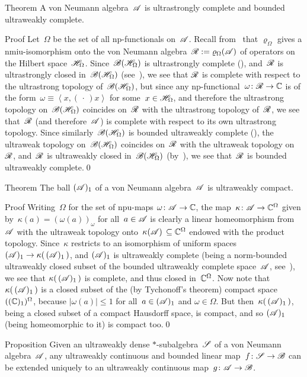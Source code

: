 \documentclass[a]{subfiles}
\begin{document}
\begin{parsec}%
\begin{point}[vn-complete]{Theorem}%
A von Neumann algebra~$\mathscr{A}$ is ultrastrongly complete
and bounded ultraweakly complete.
\begin{point}{Proof}%
Let~$\Omega$ be the set of all np-functionals
on~$\mathscr{A}$.
Recall from~
that $\varrho_\Omega$
gives a nmiu-isomorphism
onto the 
von Neumann algebra~$\mathscr{R}:=\varrho_\Omega(\mathscr{A})$ of operators
on the Hilbert space~$\mathscr{H}_\Omega$.
Since~$\mathscr{B}(\mathscr{H}_\Omega)$ is ultrastrongly complete
(),
and~$\mathscr{R}$ is  ultrastrongly closed in~$\mathscr{B}(\mathscr{H}_\Omega)$
(see~),
we see that $\mathscr{R}$
is complete with respect to the ultrastrong
topology of~$\mathscr{B}(\mathscr{H}_\Omega)$,
but since any np-functional~$\omega\colon \mathscr{R}\to\mathbb{C}$
is of the form~$\omega\equiv \left<x,(\,\cdot\,)x\right>$
for some~$x\in\mathscr{H}_\Omega$,
and therefore  the ultrastrong topology on~$\mathscr{B}(\mathscr{H}_\Omega)$
coincides on~$\mathscr{R}$ with the ultrastrong topology of~$\mathscr{R}$,
we see that~$\mathscr{R}$ (and therefore~$\mathscr{A}$)
is complete with respect to its own ultrastrong topology.
Since similarly~$\mathscr{B}(\mathscr{H}_\Omega)$
is bounded ultraweakly complete (),
the ultraweak topology on~$\mathscr{B}(\mathscr{H}_\Omega)$
coincides on~$\mathscr{R}$ with the ultraweak topology on~$\mathscr{R}$,
and~$\mathscr{R}$ is ultraweakly closed
in~$\mathscr{B}(\mathscr{H}_\Omega)$
(by~),
we see that~$\mathscr{R}$ is bounded ultraweakly complete.\qed
\end{point}
\end{point}
\begin{point}{Theorem}%
The ball $(\mathscr{A})_1$
of a von Neumann algebra~$\mathscr{A}$ is ultraweakly compact.
\begin{point}{Proof}%
Writing~$\Omega$ for
the set of npu-maps $\omega\colon \mathscr{A}\to\mathbb{C}$,
the map~$\kappa\colon \mathscr{A}\to \mathbb{C}^\Omega$
given by~$\kappa(a)=(\omega(a))_\omega$ for all~$a\in\mathscr{A}$
is clearly a linear homeomorphism from~$\mathscr{A}$ with the  ultraweak topology 
onto~$\kappa(\mathscr{A})\,\subseteq \mathbb{C}^\Omega$ endowed
with the product topology.
Since~$\kappa$ restricts
to an isomorphism of uniform spaces
$(\mathscr{A})_1\to \kappa(\,(\mathscr{A})_1\,)$,
and $(\mathscr{A})_1$ is ultraweakly complete 
(being a norm-bounded ultraweakly closed
subset of the bounded ultraweakly complete space~$\mathscr{A}$,
see~),
we see that $\kappa(\,(\mathscr{A})_1\,)$
is complete,
and thus closed in~$\mathbb{C}^\Omega$.
Now note that~$\kappa(\,(\mathscr{A})_1\,)$ is a closed subset 
of the (by Tychonoff's theorem) compact
space~$((\mathbb{C})_1)^\Omega$, 
because $\left|\omega(a)\right|\leq 1$ for all~$a\in(\mathscr{A})_1$
and $\omega\in\Omega$.
But then~$\kappa(\,(\mathscr{A})_1\,)$,
being a closed subset of a compact Hausdorff space,
is compact,
and so $(\mathscr{A})_1$ (being homeomorphic to it) is compact too.\qed
\end{point}
\end{point}
\begin{point}[vn-extension]{Proposition}%
Given an ultraweakly dense $*$-subalgebra~$\mathscr{S}$
of a von Neumann algebra~$\mathscr{A}$,
any ultraweakly continuous and bounded linear map~$f\colon \mathscr{S}\to\mathscr{B}$
can be extended uniquely
to an ultraweakly continuous map~$g\colon \mathscr{A}\to\mathscr{B}$.


\end{point}
\end{parsec}
\end{document}
